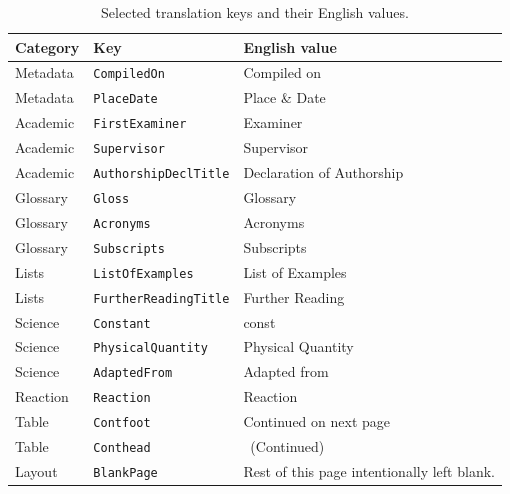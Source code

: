 \begin{table}[htbp]
  \centering
  \caption{Selected translation keys and their English values.}
  \label{tab:translation-keys}
  \begin{tabular}{@{}lll@{}}
    \toprule
    Category & Key & English value \\
    \midrule
    Metadata & \texttt{CompiledOn}     & Compiled on \\
    Metadata & \texttt{PlaceDate}       & Place \& Date \\
    Academic & \texttt{FirstExaminer}   & Examiner \\
    Academic & \texttt{Supervisor}      & Supervisor \\
    Academic & \texttt{AuthorshipDeclTitle} & Declaration of Authorship \\
    Glossary & \texttt{Gloss}           & Glossary \\
    Glossary & \texttt{Acronyms}        & Acronyms \\
    Glossary & \texttt{Subscripts}      & Subscripts \\
    Lists    & \texttt{ListOfExamples}  & List of Examples \\
    Lists    & \texttt{FurtherReadingTitle} & Further Reading \\
    Science  & \texttt{Constant}        & const \\
    Science  & \texttt{PhysicalQuantity} & Physical Quantity \\
    Science  & \texttt{AdaptedFrom}     & Adapted from \\
    Reaction & \texttt{Reaction}        & Reaction \\
    Table    & \texttt{Contfoot}        & Continued on next page \\
    Table    & \texttt{Conthead}        & \ (Continued) \\
    Layout   & \texttt{BlankPage}       & Rest of this page intentionally left blank. \\
    \bottomrule
  \end{tabular}
\end{table}
